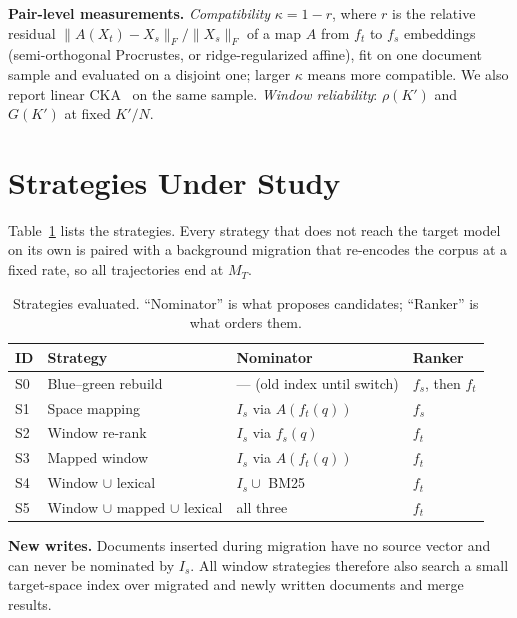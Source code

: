 \documentclass[conference]{IEEEtran}
\begin{document}
\textbf{Pair-level measurements.} \emph{Compatibility} $\kappa = 1 - r$, where $r$ is the
relative residual $\lVert A(X_t) - X_s\rVert_F / \lVert X_s\rVert_F$ of a map $A$ from $f_t$ to
$f_s$ embeddings (semi-orthogonal Procrustes, or ridge-regularized affine), fit on one
document sample and evaluated on a disjoint one; larger $\kappa$ means more compatible.
We also report linear CKA~\cite{cka} on the same sample.
\emph{Window reliability}: $\rho(K')$ and $G(K')$ at fixed $K'/N$.

\section{Strategies Under Study}\label{sec:strategies}

Table~\ref{tab:strategies} lists the strategies. Every strategy that does not reach
the target model on its own is paired with a background migration that re-encodes the
corpus at a fixed rate, so all trajectories end at $M_T$.

\begin{table}[t]
\centering
\caption{Strategies evaluated. ``Nominator'' is what proposes candidates; ``Ranker''
is what orders them.}
\label{tab:strategies}
\small
\begin{tabular}{@{}llll@{}}
\toprule
ID & Strategy & Nominator & Ranker \\
\midrule
S0 & Blue--green rebuild & --- (old index until switch) & $f_s$, then $f_t$ \\
S1 & Space mapping~\cite{drift-adapter} & $I_s$ via $A(f_t(q))$ & $f_s$ \\
S2 & Window re-rank~\cite{embedflow,thaw-anon} & $I_s$ via $f_s(q)$ & $f_t$ \\
S3 & Mapped window & $I_s$ via $A(f_t(q))$ & $f_t$ \\
S4 & Window $\cup$ lexical & $I_s \cup$ BM25~\cite{bm25} & $f_t$ \\
S5 & Window $\cup$ mapped $\cup$ lexical & all three & $f_t$ \\
\bottomrule
\end{tabular}
\end{table}

\textbf{New writes.} Documents inserted during migration have no source vector and can
never be nominated by $I_s$. All window strategies therefore also search a small
target-space index over migrated and newly written documents and merge results.
\end{document}
